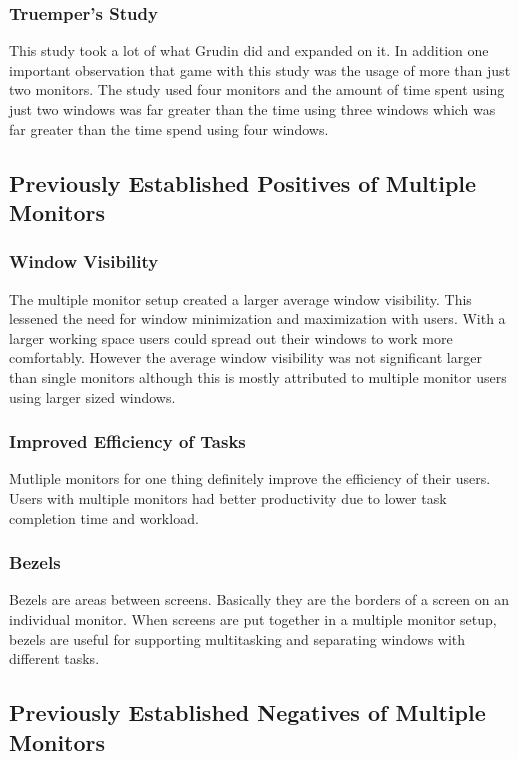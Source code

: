 \documentclass[a4paper]{article}
\begin{document}
\subsubsection{Truemper's Study}
This study took a lot of what Grudin did and expanded on it. In addition one important observation that game with this study was the usage of more than just two monitors. The study used four monitors and the amount of time spent using just two windows was far greater than the time using three windows which was far greater than the time spend using four windows.

\subsection{Previously Established Positives of Multiple Monitors}

\subsubsection{Window Visibility}
The multiple monitor setup created a larger average window visibility.\cite{Hutchings} This lessened the need for window minimization and maximization with users.\cite{Grudin} With a larger working space users could spread out their windows to work more comfortably.\cite{Truemper} However the average window visibility was not significant larger than single monitors although this is mostly attributed to multiple monitor users using larger sized windows.\cite{Hutchings}

\subsubsection{Improved Efficiency of Tasks}
Mutliple monitors for one thing definitely improve the efficiency of their users. Users with multiple monitors had better productivity due to lower task completion time and workload.\cite{Kang}

\subsubsection{Bezels}
Bezels are areas between screens.\cite{Truemper} Basically they are the borders of a screen on an individual monitor. When screens are put together in a multiple monitor setup, bezels are useful for supporting multitasking and separating windows with different tasks.



\subsection{Previously Established Negatives of Multiple Monitors}
\end{document}
